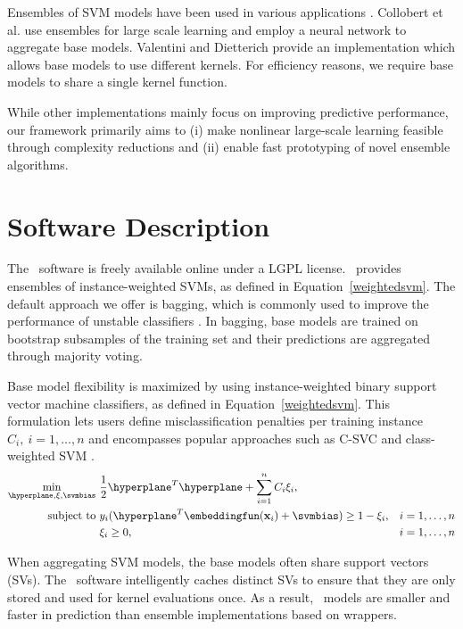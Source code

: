 Ensembles of SVM models have been used in various applications
\citep{Wang20096466,5646323,citeulike:9860864}.
Collobert et al. \citep{Collobert02} use ensembles for large scale learning and employ a neural
network to aggregate base models.
Valentini and Dietterich \citep{Valentini03lowbias} provide an implementation which allows base models to use different kernels.
For efficiency reasons, we require base models to share a single kernel function. 

While other implementations mainly focus on improving predictive performance, our framework
primarily aims to (i) make nonlinear large-scale learning feasible through complexity reductions and (ii) enable fast prototyping of novel ensemble algorithms.

\section{Software Description}
The \esvm\ software is freely available online under a
LGPL license. \esvm\ provides ensembles of
instance-weighted SVMs, as defined in Equation~\eqref{weightedsvm}.
The default approach we offer is bagging, which is commonly used to improve the
performance of unstable classifiers \citep{Breiman:1996:BP:231986.231989}. In
bagging, base models are trained on bootstrap subsamples of the training set
and their predictions are aggregated through majority voting.

Base model flexibility is maximized by using instance-weighted binary support
vector machine classifiers, as defined in Equation~\eqref{weightedsvm}. This formulation lets users define
misclassification penalties per training instance $C_i,\ i=1,\ldots,n$ and
encompasses popular approaches such as C-SVC and class-weighted SVM
\citep{Cortes:1995:SN:218919.218929, osuna1997}.
\begin{align}
\mathbf{\min_{\hyperplane,\mathbf{\xi},\svmbias} } \ &
\frac{1}{2}\hyperplane^T\hyperplane+\sum_{i=1}^n C_i \xi_i,
\label{weightedsvm} \\
\text{subject\ to }  &y_i(\hyperplane^T\embeddingfun(\mathbf{x}_i)+\svmbias)\geq 1-\xi_i,
&i=1,\ldots,n \nonumber \\
&\xi_i \geq 0, &i=1,\ldots,n \nonumber  
\end{align}

When aggregating SVM models, the base models often share support
vectors (SVs). The \esvm\ software intelligently caches distinct SVs to ensure
that they are only stored and used for kernel evaluations once. As a result,
\esvm\ models are smaller and faster in prediction than ensemble implementations based on wrappers.

